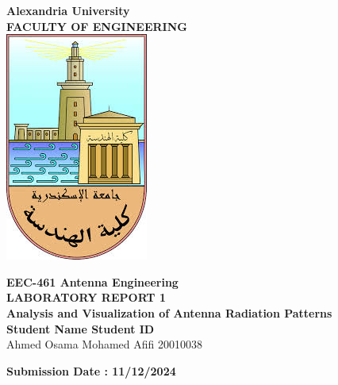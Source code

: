 \documentclass[a4paper, 12pt, english]{article}
\begin{document}
\begin{titlepage}
\begin{center}
\textbf{\LARGE Alexandria University}\\[0.5cm] 
\textbf{\large FACULTY OF ENGINEERING}\\[0.2cm]
\vspace{20pt}
\includegraphics{logo.png}\\[1cm]
\par
\vspace{20pt}
\textbf{\Large EEC-461 Antenna Engineering}\\
\vspace{15pt}
\myrule[1pt][7pt]
\textbf{\LARGE  LABORATORY REPORT 1}\\
\vspace{15pt}
\textbf{\large Analysis and Visualization of Antenna Radiation Patterns}\\
\myrule[1pt][7pt]
\vspace{25pt}
\textbf{\large \hspace{50pt}Student Name \hspace{60pt} Student ID}\\
Ahmed Osama Mohamed Afifi \hspace{60pt} 20010038 \\

\vspace{45pt}
\end{center}

\par
\vfill
\begin{center}
\textbf{Submission Date : 11/12/2024}\\
\end{center}

\end{titlepage}
\end{document}
